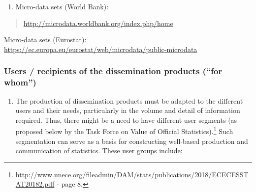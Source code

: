 \documentclass[
]{article}
\providecommand{\tightlist}{%
  \setlength{\itemsep}{0pt}\setlength{\parskip}{0pt}}
\begin{document}
\begin{enumerate}
\def\labelenumi{\arabic{enumi}.}
\setcounter{enumi}{515}
\tightlist
\item
  Micro-data sets (World Bank):
\end{enumerate}

\begin{quote}
\url{http://microdata.worldbank.org/index.php/home}
\end{quote}

Micro-data sets (Eurostat):\\
\url{https://ec.europa.eu/eurostat/web/microdata/public-microdata}

\hypertarget{section}{%
\subsubsection{}\label{section}}

\hypertarget{users-recipients-of-the-dissemination-products-for-whom}{%
\subsubsection{Users / recipients of the dissemination products (``for whom'')}\label{users-recipients-of-the-dissemination-products-for-whom}}

\begin{enumerate}
\def\labelenumi{\arabic{enumi}.}
\setcounter{enumi}{516}
\tightlist
\item
  The production of dissemination products must be adapted to the
  different users and their needs, particularly in the volume and
  detail of information required. Thus, there might be a need to have
  different user segments (as proposed below by the Task Force on
  Value of Official Statistics).\footnote{\url{http://www.unece.org/fileadmin/DAM/stats/publications/2018/ECECESSTAT20182.pdf}
    - page 8.} Such segmentation can serve as a
  basis for constructing well-based production and communication of
  statistics. These user groups include:
\end{enumerate}
\end{document}
